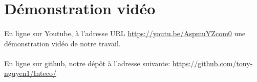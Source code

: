 \documentclass[a4paper]{article}
\begin{document}
        \section*{Démonstration vidéo}
            \paragraph{}
                En ligne sur Youtube, à l'adresse URL \url{https://youtu.be/AspmuYZcom0} une démonstration vidéo de notre travail.
            \paragraph{}
                En ligne sur github, notre dépôt à l'adresse suivante: \url{https://github.com/tony-nguyen1/Inteco/}
\end{document}
